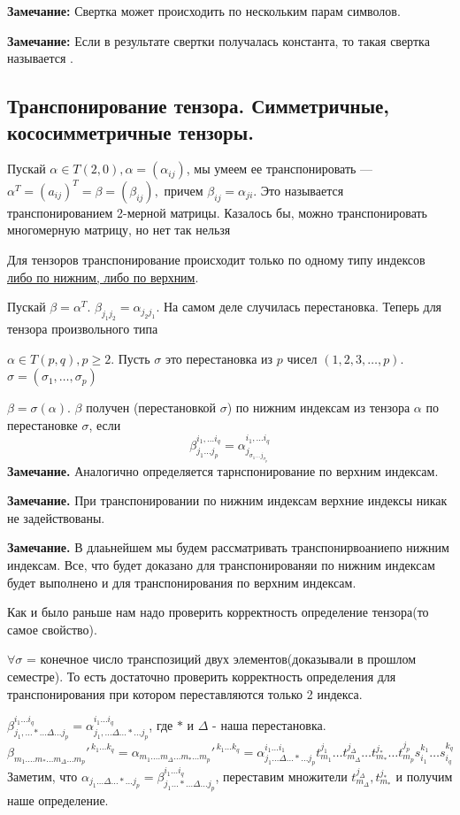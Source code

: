 \textbf{Замечание:} Свертка может происходить по нескольким парам символов.

\textbf{Замечание:} Если в результате свертки получалась константа, то такая свертка называется .


\newpage
\subsection{Транспонирование тензора. Симметричные, кососимметричные тензоры.}

Пускай $\alpha \in T(2,0), \alpha = (\alpha_{ij})$, мы умеем ее транспонировать --- $\alpha^T =(a_{ij})^T =\beta = (\beta_{ij}),$ причем $\beta_{ij} = \alpha_{ji}$. Это называется транспонированием 2-мерной матрицы.
Казалось бы, можно транспонировать многомерную матрицу, но нет так нельзя

Для тензоров транспонирование происходит только по одному типу индексов \uline{либо по нижним, либо по верхним}.

Пускай $\beta = \alpha^T$. $\beta_{j_1j_2} = \alpha_{j_2j_1}$. На самом деле случилась перестановка. Теперь для тензора произвольного типа

 $\alpha \in T(p,q), p\geq 2$. Пусть $\sigma$ это перестановка из $p$ чисел $(1,2,3,\ldots, p)$. $\sigma = (\sigma_1,\ldots,\sigma_p)$

$\beta = \sigma(\alpha)$. $\beta$ получен  (перестановкой $\sigma$) по нижним индексам из тензора $\alpha$ по перестановке $\sigma$, если
$$\beta_{j_1\ldots j_p}^{i_1,\ldots i_q} = \alpha_{j_{\sigma_1 \ldots j_{\sigma_p}}}^{i_1,\ldots i_q}$$
\textbf{Замечание.} Аналогично определяется тарнспонирование по верхним индексам.

\textbf{Замечание.} При транспонировании по нижним индексам верхние индексы никак не задействованы.

\textbf{Замечание.} В длаьнейшем мы будем рассматривать транспонирвоаниепо нижним индексам. Все, что будет доказано для транспонированяи по нижним индексам будет выполнено и для транспонирования по верхним индексам.

Как и было раньше нам надо проверить корректность определение тензора(то самое свойство).

$\forall \sigma$ = конечное число транспозиций двух элементов(доказывали в прошлом семестре). То есть достаточно проверить корректность определения для транспонирования при котором переставляются только 2 индекса.


$\beta_{j_1, \ldots* \ldots  \Delta \ldots j_p}^{i_1\ldots i_q}= \alpha_{j_1, \ldots \Delta\ldots  * \ldots j_p}^{i_1\ldots i_q}$, где $*$ и $\Delta$ - наша перестановка.
$$\beta_{m_1.\ldots m_{*}\dots m_{\Delta}\ldots m_p}'^{\, k_1 \ldots k_q} = \alpha_{m_1.\ldots m_{\Delta}\dots m_{*}\ldots m_p}'^{\, k_1 \ldots k_q}  = \alpha^{i_1 \ldots i_1}_{j_1\ldots \Delta \ldots * \ldots  j_p}t_{m_1}^{j_1} \ldots t_{m_\Delta}^{j_\Delta}\ldots t_{m_*}^{j_*} \ldots t_{m_p}^{j_p}s_{i_1}^{k_1}\ldots s_{i_q}^{k_q}$$
Заметим, что $\alpha_{j_1\ldots \Delta\ldots *\ldots j_p} = \beta_{j_1\ldots * \ldots \Delta \ldots j_p}^{i_1 \ldots i_q}$, переставим множители $t_{m_\Delta}^{j_\Delta}, t_{m_*}^{j_*}$ и получим наше определение.

